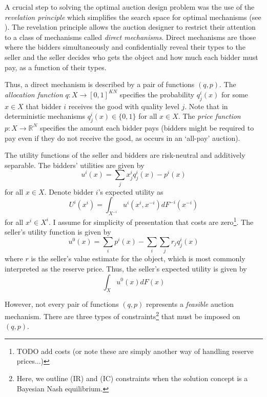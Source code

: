 A crucial step to solving the optimal auction design problem was the use of the \textit{revelation principle} which simplifies the search space for optimal mechanisms (see \cite[Lemma 1]{myerson1981optimal}). The revelation principle allows the auction designer to restrict their attention to a class of mechanisms called \textit{direct mechanisms}. Direct mechanisms are those where the bidders simultaneously and confidentially reveal their types to the seller and the seller decides who gets the object and how much each bidder must pay, as a function of their types.

Thus, a direct mechanism is described by a pair of functions $(q, p)$. The \textit{allocation function} $q:X\to[0,1]^{KN}$ specifies the probability $q_j^i(x)$ for some $x \in X$ that bidder $i$ receives the good with quality level $j$. Note that in deterministic mechanisms $q_j^i(x) \in \{0,1\}$ for all $x \in X$. The \textit{price function} $p:X\to\mathbb{R}^N$ specifies the amount each bidder pays (bidders might be required to pay even if they do not receive the good, as occurs in an `all-pay' auction).

The utility functions of the seller and bidders are risk-neutral and additively separable. The bidders' utilities are given by
\begin{equation}
    u^i(x) = \sum_j x_j^i q_j^i(x) - p^i(x)
\end{equation}
\noindent for all $x \in X$. Denote bidder $i$'s expected utility as
\begin{equation}\label{eq_expected_U}
    U^i(x^i) = \int_{X^{-i}} u^i(x^i,x^{-i}) dF^{-i}(x^{-i})
\end{equation}
\noindent for all $x^i \in X^i$. I assume for simplicity of presentation that costs are zero\footnote{\color{red}TODO add costs (or note these are simply another way of handling reserve prices...)}. The seller's utility function is given by
\begin{equation}
    u^0(x) = \sum_i p^i(x) - \sum_i \sum_j r_j q_j^i(x)  
\end{equation}
\noindent where $r$ is the seller's value estimate for the object, which is most commonly interpreted as the reserve price. Thus, the seller's expected utility is given by
\begin{equation}
    \int_X u^0(x) dF(x)
\end{equation}

However, not every pair of functions $(q,p)$ represents a \textit{feasible} auction mechanism. There are three types of constraints\footnote{Here, we outline (IR) and (IC) constraints when the solution concept is a Bayesian Nash equilibrium.} that must be imposed on $(q,p)$. 

